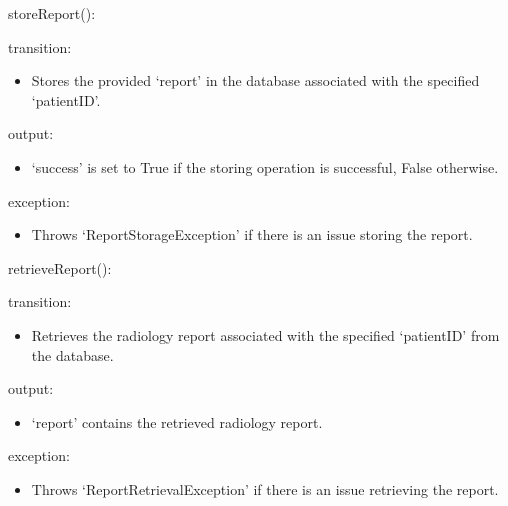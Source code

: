 \documentclass[12pt, titlepage]{article}
\begin{document}
\noindent storeReport():
\begin{itemize}
  \begin{item}
    transition:
    \begin{itemize}
      \item Stores the provided `report' in the database associated with the
        specified `patientID'.
    \end{itemize}
  \end{item}
  \begin{item}
    output:
    \begin{itemize}
      \item `success' is set to True if the storing operation is successful,
        False otherwise.
    \end{itemize}
  \end{item}
  \begin{item}
    exception:
    \begin{itemize}
      \item Throws `ReportStorageException' if there is an issue storing the
        report.
    \end{itemize}
  \end{item}
\end{itemize}

\noindent retrieveReport():
\begin{itemize}
  \begin{item}
    transition:
    \begin{itemize}
      \item Retrieves the radiology report associated with the specified
        `patientID' from the database.
    \end{itemize}
  \end{item}
  \begin{item}
    output:
    \begin{itemize}
      \item `report' contains the retrieved radiology report.
    \end{itemize}
  \end{item}
  \begin{item}
    exception:
    \begin{itemize}
      \item Throws `ReportRetrievalException' if there is an issue retrieving the report.
    \end{itemize}
  \end{item}
\end{itemize}
\end{document}
